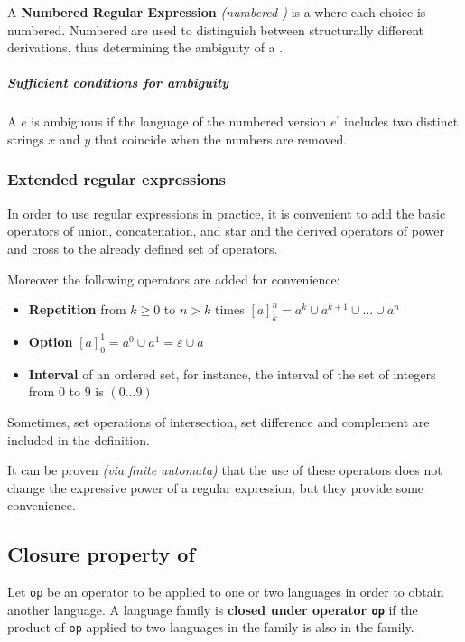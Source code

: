 \documentclass[english]{article}
\begin{document}
\begin{definition}
  A \textbf{Numbered Regular Expression} \textit{(numbered \re)} is a \re where each choice is numbered.
  Numbered \re are used to distinguish between structurally different derivations, thus determining the ambiguity of a \re.
\end{definition}

\subparagraph*{Sufficient conditions for ambiguity}

A \re \(e\) is ambiguous if the language of the numbered version \(e^\prime\) includes two distinct strings \(x\) and \(y\) that coincide when the numbers are removed.

\subsubsection{Extended regular expressions}

In order to use regular expressions in practice, it is convenient to add the basic operators of union, concatenation, and star and the derived operators of power and cross to the already defined set of operators.

Moreover the following operators are added for convenience:

\begin{itemize}
  \item \textbf{Repetition} from \(k \geq 0\) to \(n > k\) times \([a]^n_k = a^k \cup a^{k+1} \cup \ldots \cup a^n\)
  \item \textbf{Option} \([a]^1_0 = a^0 \cup a^1 = \varepsilon \cup a\)
  \item \textbf{Interval} of an ordered set, for instance, the interval of the set of integers from \(0\) to \(9\) is \((0 \ldots 9)\)
\end{itemize}

Sometimes, set operations of intersection, set difference and complement are included in the definition.

\bigskip
It can be proven \textit{(via finite automata)} that the use of these operators does not change the expressive power of a regular expression, but they provide some convenience.

\subsection{Closure property of \REG}
\label{sec:closure-of-regular-expressions}

Let \texttt{op} be an operator to be applied to one or two languages in order to obtain another language.
A language family is \textbf{closed under operator \texttt{op}} if the product of \texttt{op} applied to two languages in the family is also in the family.
\end{document}
